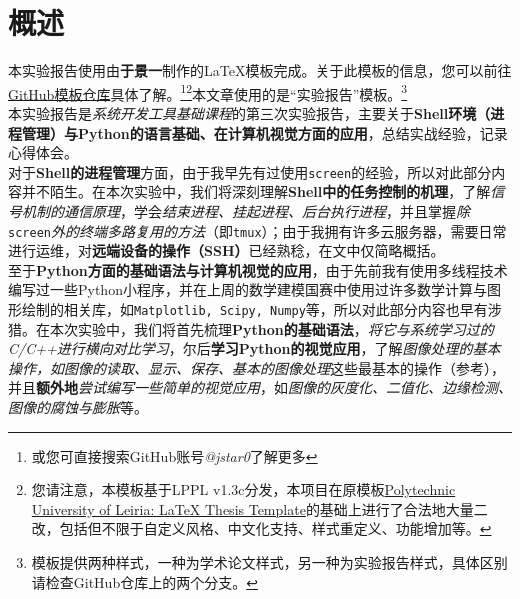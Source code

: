 \thispagestyle{plain} %
\chapter*{概述} %
\label{cp:abstract}

本实验报告使用由\textbf{于景一}制作的\LaTeX{}模板完成。关于此模板的信息，您可以前往\href{https://github.com/jstar0/LaTeXTemplate/}{GitHub模板仓库}具体了解。\footnote{或您可直接搜索GitHub账号\textit{@jstar0}了解更多}\footnote{您请注意，本模板基于LPPL v1.3c分发，本项目在原模板\href{https://github.com/joseareia/ipleiria-thesis}{Polytechnic University of Leiria: LaTeX Thesis Template}的基础上进行了合法地大量二改，包括但不限于自定义风格、中文化支持、样式重定义、功能增加等。}本文章使用的是“实验报告”模板。\footnote{模板提供两种样式，一种为学术论文样式，另一种为实验报告样式，具体区别请检查GitHub仓库上的两个分支。}\\

本实验报告是\textit{系统开发工具基础课程}的第三次实验报告，主要关于\textbf{Shell环境（进程管理）与Python的语言基础、在计算机视觉方面的应用}，总结实战经验，记录心得体会。 \\

对于\textbf{Shell的进程管理}方面，由于我早先有过使用\texttt{screen}的经验，所以对此部分内容并不陌生。在本次实验中，我们将深刻理解\textbf{Shell中的任务控制的机理}，了解\textit{信号机制的通信原理}，学会\textit{结束进程、挂起进程、后台执行进程}，并且掌握\textit{除}\texttt{screen}\textit{外的终端多路复用的方法}（即\texttt{tmux}）；由于我拥有许多云服务器，需要日常进行运维，对\textbf{远端设备的操作（SSH）}已经熟稔，在文中仅简略概括。\\

至于\textbf{Python方面的基础语法与计算机视觉的应用}，由于先前我有使用多线程技术编写过一些Python小程序，并在上周的数学建模国赛中使用过许多数学计算与图形绘制的相关库，如\texttt{Matplotlib, Scipy, Numpy}等，所以对此部分内容也早有涉猎。在本次实验中，我们将首先梳理\textbf{Python的基础语法}，\textit{将它与系统学习过的C/C++进行横向对比学习}，尔后\textbf{学习Python的视觉应用}，了解\textit{图像处理的基本操作，如图像的读取、显示、保存、基本的图像处理}这些最基本的操作（参考\cite{solem2014python计算机视觉编程}），并且\textbf{额外地}\textit{尝试编写一些简单的视觉应用}，如\textit{图像的灰度化、二值化、边缘检测、图像的腐蚀与膨胀}等。\\

